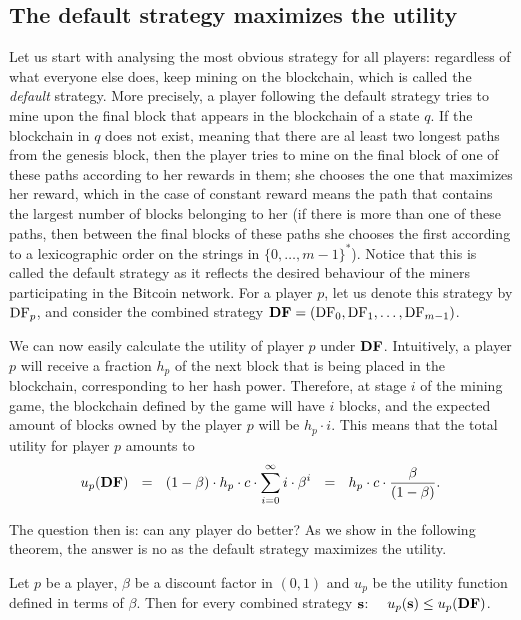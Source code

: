  \subsection{The default strategy maximizes the utility}

Let us start with analysing the most obvious strategy for all players: regardless of what everyone else does, keep mining on the blockchain, which is called the \emph{default} strategy.
More precisely, a player following the default strategy tries to mine upon the final block that appears in the blockchain of a state $q$. If the blockchain in $q$ does not exist, meaning that there are al least two longest paths from the genesis block, then the player tries to mine on the final block of one of these paths according to her rewards in them; she chooses the one that maximizes her reward, which in the case of constant reward means the path that contains the largest number of blocks belonging to her (if there is more than one of these paths, then between the final blocks of these paths she chooses the first according to a lexicographic order on the strings in $\{0, \ldots, m-1\}^*$). 
Notice that this is called the default strategy as it reflects the desired behaviour of the miners participating in the Bitcoin network. For a player $p$, let us denote this strategy 
by $\text{\rm DF}_p$, and consider the combined strategy $\text{\rm {\bf DF}} = (\text{\rm DF}_0,\text{\rm DF}_1,\dots,\text{\rm DF}_{m-1})$. 

We can now easily calculate the utility of player $p$ under $\text{\rm {\bf DF}}$. Intuitively, a player $p$ will receive a fraction $h_p$ of the next block that is being placed in the blockchain, corresponding to her hash power. Therefore, at stage $i$ of the mining game, the blockchain defined by the game will have $i$ blocks, and the expected amount of blocks owned by the player $p$ will be $h_p\cdot i$. This means that the total utility for player $p$ amounts to 
$$u_p(\cdf) \ \ = \ \ (1 - \beta) \cdot h_p \cdot c\cdot \sum_{i=0}^{\infty}i \cdot \beta^{i} \ \ = \ \ h_p\cdot c \cdot \frac{\beta}{(1-\beta)}.$$


The question then is: can any player do better? As we show in the following theorem, the answer is no as the default strategy maximizes the utility. 
\begin{mythm}\label{thm-conts_dom_str}
Let $p$ be a player, $\beta$ be a discount factor in $(0,1)$ and $u_p$ be the utility function defined in terms of $\beta$. Then for every combined strategy $\mathbf{s}$: \ \ $u_p(\mathbf{s}) \leq u_p(\text{\rm {\bf DF}})$.
\end{mythm} 

